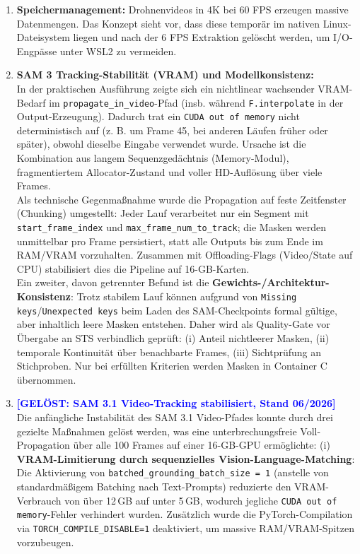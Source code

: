 \documentclass[12pt,a4paper]{article}
\begin{document}
\begin{enumerate}
\begin{itemize}[noitemsep]
          \end{itemize}
    \item \textbf{Speichermanagement:} Drohnenvideos in 4K bei 60 FPS erzeugen massive Datenmengen. Das Konzept sieht vor, dass diese temporär im nativen Linux-Dateisystem liegen und nach der 6 FPS Extraktion gelöscht werden, um I/O-Engpässe unter WSL2 zu vermeiden.
    \item \textbf{SAM 3 Tracking-Stabilität (VRAM) und Modellkonsistenz:} \\
          In der praktischen Ausführung zeigte sich ein nichtlinear wachsender VRAM-Bedarf im \texttt{propagate\_in\_video}-Pfad (insb. während \texttt{F.interpolate} in der Output-Erzeugung). Dadurch trat ein \texttt{CUDA out of memory} nicht deterministisch auf (z. B. um Frame 45, bei anderen Läufen früher oder später), obwohl dieselbe Eingabe verwendet wurde. Ursache ist die Kombination aus langem Sequenzgedächtnis (Memory-Modul), fragmentiertem Allocator-Zustand und voller HD-Auflösung über viele Frames. \\
          Als technische Gegenmaßnahme wurde die Propagation auf feste Zeitfenster (Chunking) umgestellt: Jeder Lauf verarbeitet nur ein Segment mit \texttt{start\_frame\_index} und \texttt{max\_frame\_num\_to\_track}; die Masken werden unmittelbar pro Frame persistiert, statt alle Outputs bis zum Ende im RAM/VRAM vorzuhalten. Zusammen mit Offloading-Flags (Video/State auf CPU) stabilisiert dies die Pipeline auf 16-GB-Karten. \\
          Ein zweiter, davon getrennter Befund ist die \textbf{Gewichts-/Architektur-Konsistenz}: Trotz stabilem Lauf können aufgrund von \texttt{Missing keys}/\texttt{Unexpected keys} beim Laden des SAM-Checkpoints formal gültige, aber inhaltlich leere Masken entstehen. Daher wird als Quality-Gate vor Übergabe an STS verbindlich geprüft: (i) Anteil nichtleerer Masken, (ii) temporale Kontinuität über benachbarte Frames, (iii) Sichtprüfung an Stichproben. Nur bei erfüllten Kriterien werden Masken in Container C übernommen.
        \item \textcolor{blue}{\textbf{[GELÖST: SAM 3.1 Video-Tracking stabilisiert, Stand 06/2026]}} \\
            Die anfängliche Instabilität des SAM 3.1 Video-Pfades konnte durch drei gezielte Maßnahmen gelöst werden, was eine unterbrechungsfreie Voll-Propagation über alle 100 Frames auf einer 16-GB-GPU ermöglichte:
            (i) \textbf{VRAM-Limitierung durch sequenzielles Vision-Language-Matching}: Die Aktivierung von \texttt{batched\_grounding\_batch\_size = 1} (anstelle von standardmäßigem Batching nach Text-Prompts) reduzierte den VRAM-Verbrauch von über 12\,GB auf unter 5\,GB, wodurch jegliche \texttt{CUDA out of memory}-Fehler verhindert wurden. Zusätzlich wurde die PyTorch-Compilation via \texttt{TORCH\_COMPILE\_DISABLE=1} deaktiviert, um massive RAM/VRAM-Spitzen vorzubeugen.

\end{enumerate}
\end{document}
